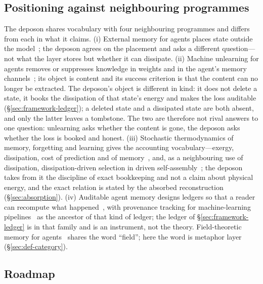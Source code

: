 \documentclass[11pt,a4paper]{article}
\begin{document}
\subsection{Positioning against neighbouring programmes}
\label{sec:def-positioning}
The deposon shares vocabulary with four neighbouring programmes and differs from each in what it claims. (i) External memory for agents places state outside the model~\cite{clark1998,memorysurvey2026,human2ai2025}; the deposon agrees on the placement and asks a different question---not what the layer stores but whether it can dissipate. (ii) Machine unlearning for agents removes or suppresses knowledge in weights and in the agent's memory channels~\cite{lin2026agents,xie2026,wang2026agentic}; its object is content and its success criterion is that the content can no longer be extracted. The deposon's object is different in kind: it does not delete a state, it books the dissipation of that state's energy and makes the loss auditable (\S\ref{sec:framework-ledger}); a deleted state and a dissipated state are both absent, and only the latter leaves a tombstone. The two are therefore not rival answers to one question: unlearning asks whether the content is gone, the deposon asks whether the loss is booked and honest. (iii) Stochastic thermodynamics of memory, forgetting and learning gives the accounting vocabulary---exergy, dissipation, cost of prediction and of memory~\cite{landauer1961,bennett1982,still2012,still2020,tkachenko2025,lepre2026,rooke2026,aguilera2025,sagawa2026,petrova2026,sudo2026}, and, as a neighbouring use of dissipation, dissipation-driven selection in driven self-assembly~\cite{england2015}; the deposon takes from it the discipline of exact bookkeeping and not a claim about physical energy, and the exact relation is stated by the absorbed reconstruction (\S\ref{sec:absorption}). (iv) Auditable agent memory designs ledgers so that a reader can recompute what happened~\cite{nian2026,ledger2026,echo2026,dieudonne2026,he2026beyond,he2026cognitive}, with provenance tracking for machine-learning pipelines~\cite{grafberger2023} as the ancestor of that kind of ledger; the ledger of \S\ref{sec:framework-ledger} is in that family and is an instrument, not the theory. Field-theoretic memory for agents~\cite{mitra2026} shares the word ``field''; here the word is metaphor layer (\S\ref{sec:def-category}).

\subsection{Roadmap}
\label{sec:def-roadmap}
\end{document}
